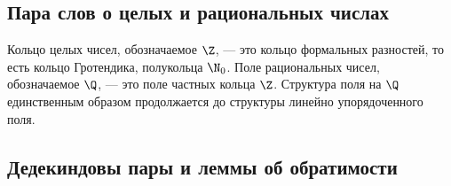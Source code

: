 \documentclass[
	extrafontsizes,
	11pt,
	hyphens,
]{memoir}
\begin{document}
\subsection{Пара слов о целых и рациональных числах}

Кольцо целых чисел, обозначаемое \(\Z\), --- это кольцо формальных разностей, то есть кольцо Гротендика, полукольца \(\N_0\).
Поле рациональных чисел, обозначаемое \(\Q\), --- это поле частных кольца \(\Z\).
Структура поля на \(\Q\) единственным образом продолжается до структуры линейно упорядоченного поля.

\subsection{Дедекиндовы пары и леммы об обратимости}



\end{document}
